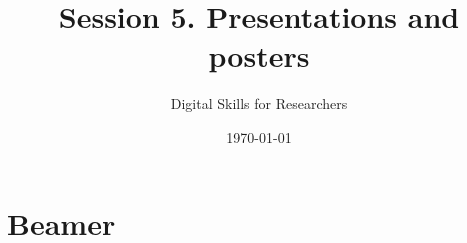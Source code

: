 \documentclass[a4paper,11pt]{article}
\title{Session 5. Presentations and posters}
\author{Digital Skills for Researchers}
\date{\today}
\begin{document}
\maketitle
\tableofcontents

\section{Beamer}

\section{}

\section{}
\end{document}
